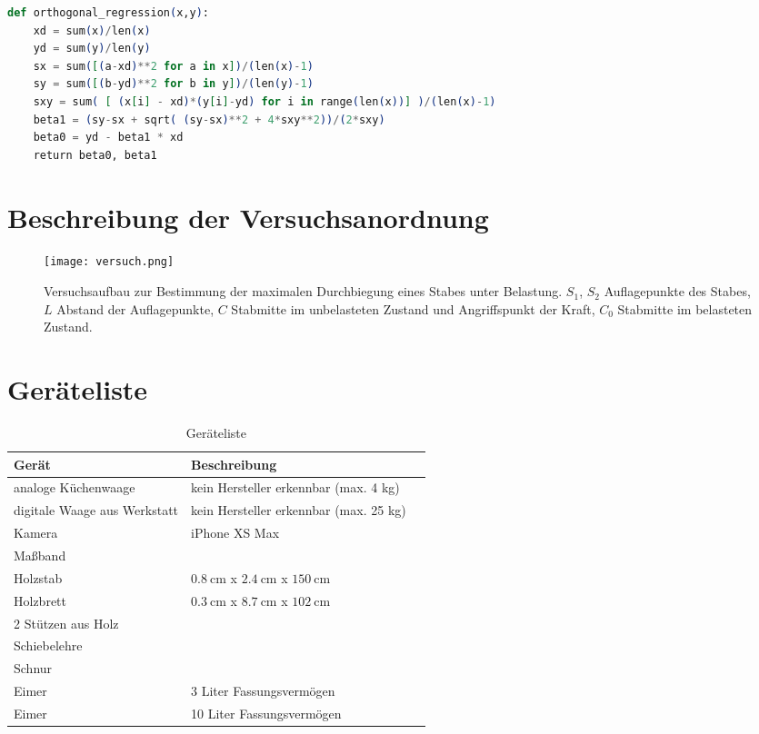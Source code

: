 \documentclass{article}
\begin{document}
\begin{lstlisting}[language=elixir, caption={Formel zur Berechnung der orthogonalen Regression.},captionpos=b, label=lst:test]
def orthogonal_regression(x,y):
	xd = sum(x)/len(x)
	yd = sum(y)/len(y)
	sx = sum([(a-xd)**2 for a in x])/(len(x)-1)
	sy = sum([(b-yd)**2 for b in y])/(len(y)-1)
	sxy = sum( [ (x[i] - xd)*(y[i]-yd) for i in range(len(x))] )/(len(x)-1)
	beta1 = (sy-sx + sqrt( (sy-sx)**2 + 4*sxy**2))/(2*sxy)
	beta0 = yd - beta1 * xd
	return beta0, beta1
\end{lstlisting}


\section{Beschreibung der Versuchsanordnung}

\begin{figure}[H]
\texttt{[image: versuch.png]}
\caption{Versuchsaufbau zur Bestimmung der maximalen Durchbiegung eines Stabes unter
Belastung. $S_1$, $S_2$ Auflagepunkte des Stabes, $L$ Abstand der Auflagepunkte, $C$ Stabmitte im unbelasteten Zustand und Angriffspunkt der Kraft, $C_0$ Stabmitte im belasteten Zustand.}
\end{figure}





\section{Geräteliste}



\begin{table}[H]
\caption{Geräteliste}



\begin{tabular}{lll}
Gerät  & Beschreibung \\
\hline
analoge Küchenwaage & kein Hersteller erkennbar (max. 4 kg) \\
digitale Waage aus Werkstatt & kein Hersteller erkennbar (max. 25 kg) \\
Kamera & iPhone XS Max \\
Maßband &  \\
Holzstab &  $0.8~$cm x $2.4~$cm x $150~$cm \\
Holzbrett & $0.3~$cm x $8.7~$cm x $102~$cm\\
2 Stützen aus Holz & \\
Schiebelehre & \\ 
Schnur & \\
Eimer & 3 Liter Fassungsvermögen\\
Eimer & 10 Liter Fassungsvermögen\\
\end{tabular}
\end{table}
\end{document}
